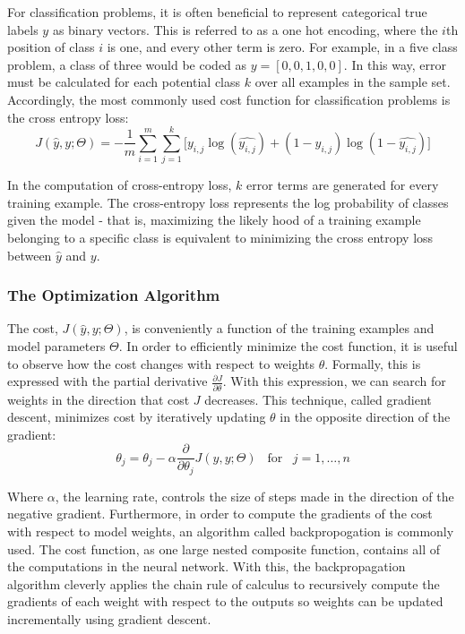 For classification problems, it is often beneficial to represent categorical true labels $y$ as binary vectors. This is referred to as a one hot encoding, where the $i$th position of class $i$ is one, and every other term is zero. For example, in a five class problem, a class of three would be coded as $y = [0,0,1,0,0]$. In this way, error must be calculated for each potential class $k$ over all examples in the sample set. Accordingly, the most commonly used cost function for classification problems is the cross entropy loss:
\begin{equation} \label{eq:softmax}
    J(\hat{y}, y; \Theta) = - \frac{1}{m}\sum_{i = 1}^{m}\sum_{j = 1}^{k} \lbrack y_{i,j} \log(\hat{y_{i,j}}) + (1 - y_{i,j})\log(1 - \hat{y_{i,j}}) \rbrack
\end{equation}

In the computation of cross-entropy loss, $k$ error terms are generated for every training example. The cross-entropy loss represents the log probability of classes given the model - that is, maximizing the likely hood of a training example belonging to a specific class is equivalent to minimizing the cross entropy loss between $\hat{y}$ and $y$. 

\subsubsection{The Optimization Algorithm}
The cost, $J(\hat{y}, y; \Theta)$, is conveniently a function of the training examples and model parameters $\Theta$. In order to efficiently minimize the cost function, it is useful to observe how the cost changes with respect to weights $\theta$. Formally, this is expressed with the partial derivative $\frac{\partial J}{\partial \theta}$. With this expression, we can search for weights in the direction that cost $J$ decreases. This technique, called gradient descent, minimizes cost by iteratively updating $\theta$ in the opposite direction of the gradient:
\begin{equation}
    \theta_j = \theta_j - \alpha \frac{\partial}{\partial \theta_j} J(\hat{y},y;\Theta) \;\;\; \mbox{for} \;\;\; j = 1,\ldots,n
\end{equation}


Where $\alpha$, the learning rate, controls the size of steps made in the direction of the negative gradient. Furthermore, in order to compute the gradients of the cost with respect to model weights, an algorithm called backpropogation is commonly used. The cost function, as one large nested composite function, contains all of the computations in the neural network. With this, the backpropagation algorithm cleverly applies the chain rule of calculus to recursively compute the gradients of each weight with respect to the outputs so weights can be updated incrementally using gradient descent. 

